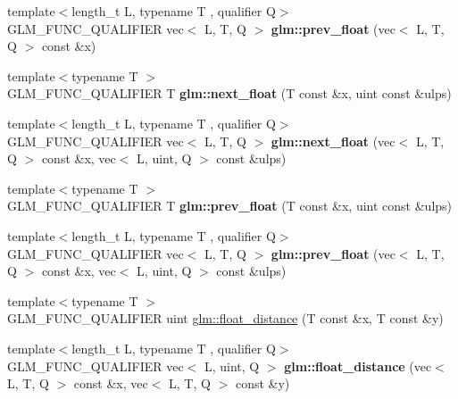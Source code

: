 \begin{DoxyCompactItemize}
{\footnotesize template$<$length\+\_\+t L, typename T , qualifier Q$>$ }\\G\+L\+M\+\_\+\+F\+U\+N\+C\+\_\+\+Q\+U\+A\+L\+I\+F\+I\+ER vec$<$ L, T, Q $>$ {\bfseries glm\+::prev\+\_\+float} (vec$<$ L, T, Q $>$ const \&x)
\item 
\mbox{\label{ulp_8inl_ae4ffae05b7502be722f522c04f7e42ac}} 
{\footnotesize template$<$typename T $>$ }\\G\+L\+M\+\_\+\+F\+U\+N\+C\+\_\+\+Q\+U\+A\+L\+I\+F\+I\+ER T {\bfseries glm\+::next\+\_\+float} (T const \&x, uint const \&ulps)
\item 
\mbox{\label{ulp_8inl_ab7a0495271c3424711ced7b771afbdd1}} 
{\footnotesize template$<$length\+\_\+t L, typename T , qualifier Q$>$ }\\G\+L\+M\+\_\+\+F\+U\+N\+C\+\_\+\+Q\+U\+A\+L\+I\+F\+I\+ER vec$<$ L, T, Q $>$ {\bfseries glm\+::next\+\_\+float} (vec$<$ L, T, Q $>$ const \&x, vec$<$ L, uint, Q $>$ const \&ulps)
\item 
\mbox{\label{ulp_8inl_a87ac8f75510274e112fe8512cfaa6935}} 
{\footnotesize template$<$typename T $>$ }\\G\+L\+M\+\_\+\+F\+U\+N\+C\+\_\+\+Q\+U\+A\+L\+I\+F\+I\+ER T {\bfseries glm\+::prev\+\_\+float} (T const \&x, uint const \&ulps)
\item 
\mbox{\label{ulp_8inl_aa08bb35b4dfd396a49111aedeb6f06b1}} 
{\footnotesize template$<$length\+\_\+t L, typename T , qualifier Q$>$ }\\G\+L\+M\+\_\+\+F\+U\+N\+C\+\_\+\+Q\+U\+A\+L\+I\+F\+I\+ER vec$<$ L, T, Q $>$ {\bfseries glm\+::prev\+\_\+float} (vec$<$ L, T, Q $>$ const \&x, vec$<$ L, uint, Q $>$ const \&ulps)
\item 
{\footnotesize template$<$typename T $>$ }\\G\+L\+M\+\_\+\+F\+U\+N\+C\+\_\+\+Q\+U\+A\+L\+I\+F\+I\+ER uint \hyperlink{group__gtc__ulp_ga2e09bd6c8b0a9c91f6f5683d68245634}{glm\+::float\+\_\+distance} (T const \&x, T const \&y)
\item 
\mbox{\label{ulp_8inl_a9fc26f96e81deb78db2dfb5d9e24e1e2}} 
{\footnotesize template$<$length\+\_\+t L, typename T , qualifier Q$>$ }\\G\+L\+M\+\_\+\+F\+U\+N\+C\+\_\+\+Q\+U\+A\+L\+I\+F\+I\+ER vec$<$ L, uint, Q $>$ {\bfseries glm\+::float\+\_\+distance} (vec$<$ L, T, Q $>$ const \&x, vec$<$ L, T, Q $>$ const \&y)
\end{DoxyCompactItemize}


